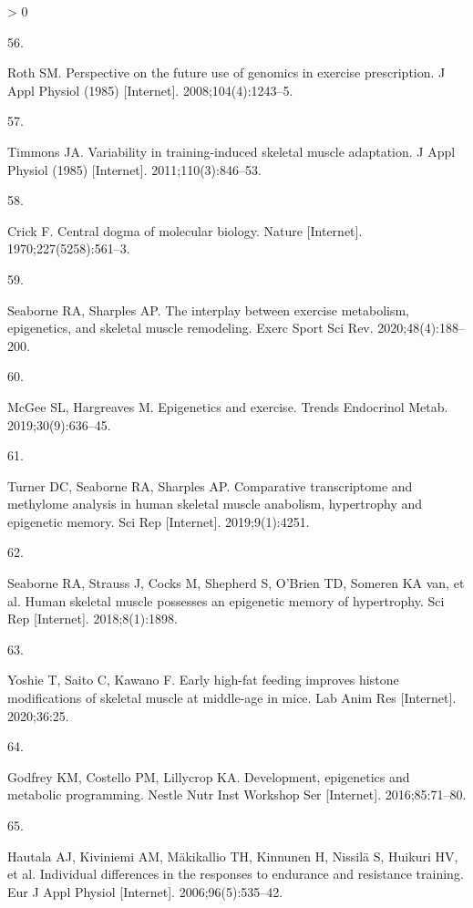 \documentclass[twoside,10pt]{gihclass} %
\newlength{\cslhangindent}
\newlength{\csllabelwidth}
\newenvironment{CSLReferences}[3] %
 {%
  \setlength{\parindent}{0pt}
  \ifodd #1 \everypar{\setlength{\hangindent}{\cslhangindent}}\ignorespaces\fi
  \ifnum #2 > 0
  \setlength{\parskip}{#2\baselineskip}
  \fi
 }%
 {}
\newcommand{\CSLLeftMargin}[1]{\parbox[t]{\maxof{\widthof{#1}}{\csllabelwidth}}{#1}}
\newcommand{\CSLRightInline}[1]{\parbox[t]{\linewidth}{#1}}
\begin{document}
\begin{CSLReferences}{0}{0}
\leavevmode\hypertarget{ref-RN2698}{}%
\CSLLeftMargin{56. }
\CSLRightInline{Roth SM. Perspective on the future use of genomics in exercise prescription. J Appl Physiol (1985) {[}Internet{]}. 2008;104(4):1243--5. }

\leavevmode\hypertarget{ref-RN758}{}%
\CSLLeftMargin{57. }
\CSLRightInline{Timmons JA. Variability in training-induced skeletal muscle adaptation. J Appl Physiol (1985) {[}Internet{]}. 2011;110(3):846--53. }

\leavevmode\hypertarget{ref-RN2692}{}%
\CSLLeftMargin{58. }
\CSLRightInline{Crick F. Central dogma of molecular biology. Nature {[}Internet{]}. 1970;227(5258):561--3. }

\leavevmode\hypertarget{ref-RN2690}{}%
\CSLLeftMargin{59. }
\CSLRightInline{Seaborne RA, Sharples AP. The interplay between exercise metabolism, epigenetics, and skeletal muscle remodeling. Exerc Sport Sci Rev. 2020;48(4):188--200. }

\leavevmode\hypertarget{ref-RN2691}{}%
\CSLLeftMargin{60. }
\CSLRightInline{McGee SL, Hargreaves M. Epigenetics and exercise. Trends Endocrinol Metab. 2019;30(9):636--45. }

\leavevmode\hypertarget{ref-RN2683}{}%
\CSLLeftMargin{61. }
\CSLRightInline{Turner DC, Seaborne RA, Sharples AP. Comparative transcriptome and methylome analysis in human skeletal muscle anabolism, hypertrophy and epigenetic memory. Sci Rep {[}Internet{]}. 2019;9(1):4251. }

\leavevmode\hypertarget{ref-RN2012}{}%
\CSLLeftMargin{62. }
\CSLRightInline{Seaborne RA, Strauss J, Cocks M, Shepherd S, O'Brien TD, Someren KA van, et al. Human skeletal muscle possesses an epigenetic memory of hypertrophy. Sci Rep {[}Internet{]}. 2018;8(1):1898. }

\leavevmode\hypertarget{ref-RN2694}{}%
\CSLLeftMargin{63. }
\CSLRightInline{Yoshie T, Saito C, Kawano F. Early high-fat feeding improves histone modifications of skeletal muscle at middle-age in mice. Lab Anim Res {[}Internet{]}. 2020;36:25. }

\leavevmode\hypertarget{ref-RN2695}{}%
\CSLLeftMargin{64. }
\CSLRightInline{Godfrey KM, Costello PM, Lillycrop KA. Development, epigenetics and metabolic programming. Nestle Nutr Inst Workshop Ser {[}Internet{]}. 2016;85:71--80. }

\leavevmode\hypertarget{ref-RN2681}{}%
\CSLLeftMargin{65. }
\CSLRightInline{Hautala AJ, Kiviniemi AM, Mäkikallio TH, Kinnunen H, Nissilä S, Huikuri HV, et al. Individual differences in the responses to endurance and resistance training. Eur J Appl Physiol {[}Internet{]}. 2006;96(5):535--42. }


\end{CSLReferences}
\end{document}
